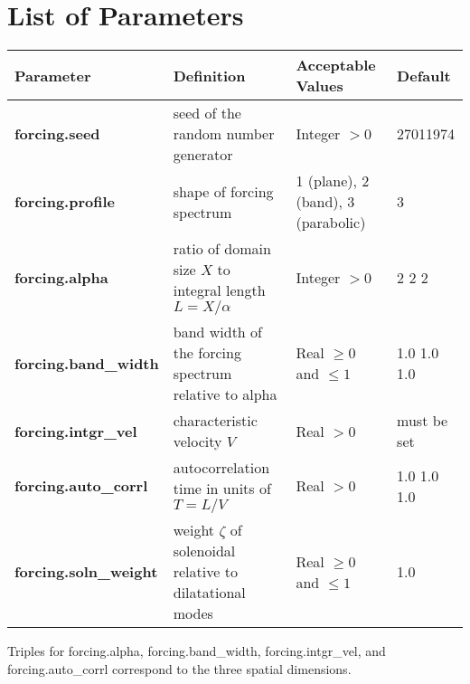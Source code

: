 \section{List of Parameters}

\begin{table*}[h]
\begin{scriptsize}
\begin{tabular}{|l|l|l|l|} \hline
Parameter & Definition & Acceptable Values & Default \\
\hline
{\bf forcing.seed} & seed of the random number generator & Integer $>0$ & 27011974 \\
{\bf forcing.profile} & shape of forcing spectrum & 1 (plane), 2 (band), 3 (parabolic) & 3\\
{\bf forcing.alpha} & ratio of domain size $X$ to integral length $L=X/\alpha$ & Integer $>0$ & 2 2 2\\
{\bf forcing.band\_width} & band width of the forcing spectrum relative to alpha & Real $\ge 0$ and $\le 1$ & 1.0 1.0 1.0\\
{\bf forcing.intgr\_vel} & characteristic velocity $V$ & Real $> 0$ & must be set\\
{\bf forcing.auto\_corrl} & autocorrelation time in units of $T=L/V$ & Real $> 0$ & 1.0 1.0 1.0\\
{\bf forcing.soln\_weight} & weight $\zeta$ of solenoidal relative to dilatational modes & Real $\ge 0$ and $\le 1$ & 1.0\\
\hline
\end{tabular}
\label{Table:Geometry}
\end{scriptsize}
\end{table*}

Triples for forcing.alpha, forcing.band\_width, forcing.intgr\_vel, and forcing.auto\_corrl correspond to the three spatial dimensions.



